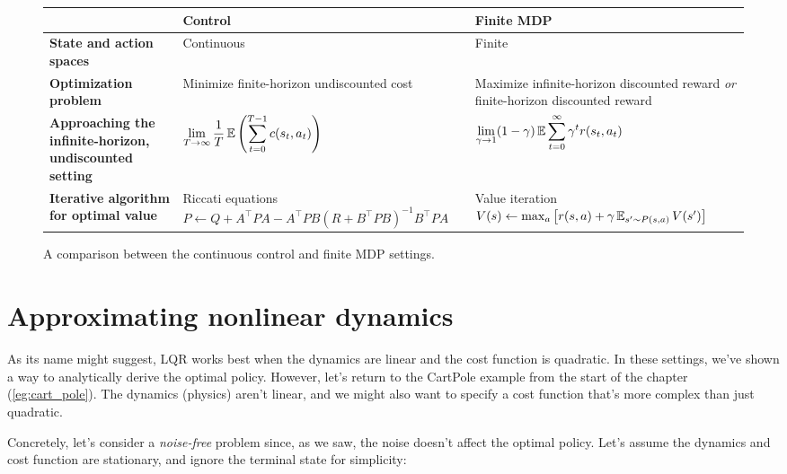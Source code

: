 \documentclass[../main/main]{subfiles}
\begin{document}

\begin{figure}[h]
    \centering
    \renewcommand{\arraystretch}{1.5}
    \begin{tabularx}{\textwidth}{m{1in} | >{\centering\arraybackslash}X | >{\centering\arraybackslash}X}
        & \textbf{Control} & \textbf{Finite MDP} \\
        \hline
        \textbf{State and action spaces} & Continuous & Finite \\
        \hline
        \textbf{Optimization problem} & Minimize finite-horizon undiscounted cost & Maximize infinite-horizon discounted reward \emph{or} finite-horizon discounted reward \\
        \hline
        \textbf{Approaching the infinite-horizon, undiscounted setting} & $\displaystyle \lim_{T \to \infty} \frac{1}{T} \operatorname*{\mathbb{E}} \left( \sum_{t=0}^{T-1} c(s_t, a_t) \right)$ & $\displaystyle \lim_{\gamma \to 1} (1 - \gamma) \operatorname*{\mathbb{E}} \sum_{t=0}^{\infty} \gamma^t r(s_t, a_t)$ \\
        \hline
        \textbf{Iterative algorithm for optimal value} & Riccati equations $P \gets Q + A^\top P A - A^\top P B (R + B^\top P B)^{-1} B^\top P A$ & Value iteration $V(s) \gets \max_a \left[ r(s, a) + \gamma \operatorname*{\mathbb{E}}_{s' \sim P(s, a)} V(s') \right]$
    \end{tabularx}
    \caption{A comparison between the continuous control and finite MDP settings.}
    \label{fig:control_mdp}
\end{figure}


\section{Approximating nonlinear dynamics}

As its name might suggest, LQR works best when the dynamics are linear and the cost function is quadratic. In these settings, we've shown a way to analytically derive the optimal policy.
However, let's return to the CartPole example from the start of the chapter (\autoref{eg:cart_pole}). The dynamics (physics) aren't linear, and we might also want to specify a cost function that's more complex than just quadratic.

Concretely, let's consider a \emph{noise-free} problem since, as we saw, the noise doesn't affect the optimal policy. Let's assume the dynamics and cost function are stationary, and ignore the terminal state for simplicity:
\end{document}
